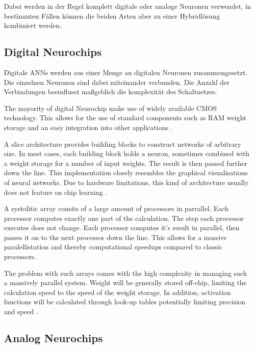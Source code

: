 \documentclass[conference]{IEEEtran}
\begin{document}
    Dabei werden in der Regel komplett digitale oder analoge Neuronen verwendet, in bestimmten Fällen können die beiden Arten aber zu einer Hybridlösung kombiniert werden.


    \subsection{Digital Neurochips}

    Digitale ANNs werden aus einer Menge an digitalen Neuronen zusammengesetzt.
    Die einzelnen Neuronen sind dabei miteinander verbunden.
    Die Anzahl der Verbindungen beeinflusst maßgeblich die komplexität des Schaltnetzes.

    The mayority of digital Neurochip make use of widely available CMOS technology.
    This allows for the use of standard components such as RAM weight storage and an easy integration into other applications \cite{dias2004artificial}.

    A slice architecture provides building blocks to construct networks of arbitrary size.
    In most cases, each building block holds a neuron, sometimes combined with a weight storage for a number of input weights.
    The result is then passed further down the line.
    This implementation closely resembles the graphical visualisations of neural networks.
    Due to hardware limitations, this kind of architecture usually does not feature on chip learning \cite{dias2004artificial}.

    A systolitic array consits of a large amount of processors in parrallel.
    Each processor computes exactly one part of the calculation.
    The step each processor executes does not change.
    Each processor computes it's result in parallel, then passes it on to the next processor down the line.
    This allows for a massive paralellistation and thereby computational speedups compared to classic processors.

    The problem with such arrays comes with the high complexity in managing such a massively parallel system.
    Weight will be generally stored off-chip, limiting the calculation speed to the speed of the weight storage.
    In addition, activation functions will be calculated through look-up tables potentially limiting precision and speed \cite{dias2004artificial}.



    \subsection{Analog Neurochips}
\end{document}
